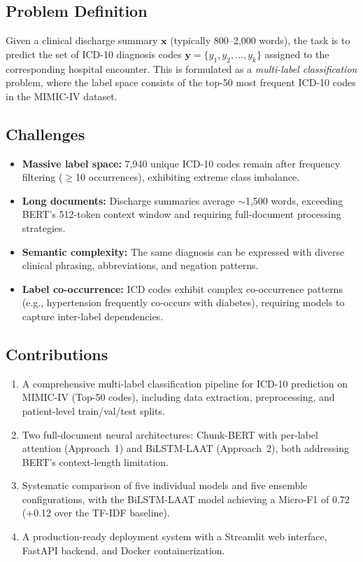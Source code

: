 \documentclass[11pt,a4paper]{article}
\begin{document}
\subsection{Problem Definition}
Given a clinical discharge summary $\mathbf{x}$ (typically 800--2,000 words), the task is to predict the set of ICD-10 diagnosis codes $\mathbf{y} = \{y_1, y_2, \ldots, y_k\}$ assigned to the corresponding hospital encounter. This is formulated as a \textit{multi-label classification} problem, where the label space consists of the top-50 most frequent ICD-10 codes in the MIMIC-IV dataset.

\subsection{Challenges}
\begin{itemize}[nosep,leftmargin=1.5em]
    \item \textbf{Massive label space:} 7,940 unique ICD-10 codes remain after frequency filtering ($\geq$10 occurrences), exhibiting extreme class imbalance.
    \item \textbf{Long documents:} Discharge summaries average $\sim$1,500 words, exceeding BERT's 512-token context window and requiring full-document processing strategies.
    \item \textbf{Semantic complexity:} The same diagnosis can be expressed with diverse clinical phrasing, abbreviations, and negation patterns.
    \item \textbf{Label co-occurrence:} ICD codes exhibit complex co-occurrence patterns (e.g., hypertension frequently co-occurs with diabetes), requiring models to capture inter-label dependencies.
\end{itemize}

\subsection{Contributions}
\begin{enumerate}[nosep,leftmargin=1.5em]
    \item A comprehensive multi-label classification pipeline for ICD-10 prediction on MIMIC-IV (Top-50 codes), including data extraction, preprocessing, and patient-level train/val/test splits.
    \item Two full-document neural architectures: Chunk-BERT with per-label attention (Approach~1) and BiLSTM-LAAT (Approach~2), both addressing BERT's context-length limitation.
    \item Systematic comparison of five individual models and five ensemble configurations, with the BiLSTM-LAAT model achieving a Micro-F1 of 0.72 (+0.12 over the TF-IDF baseline).
    \item A production-ready deployment system with a Streamlit web interface, FastAPI backend, and Docker containerization.
\end{enumerate}
\end{document}
